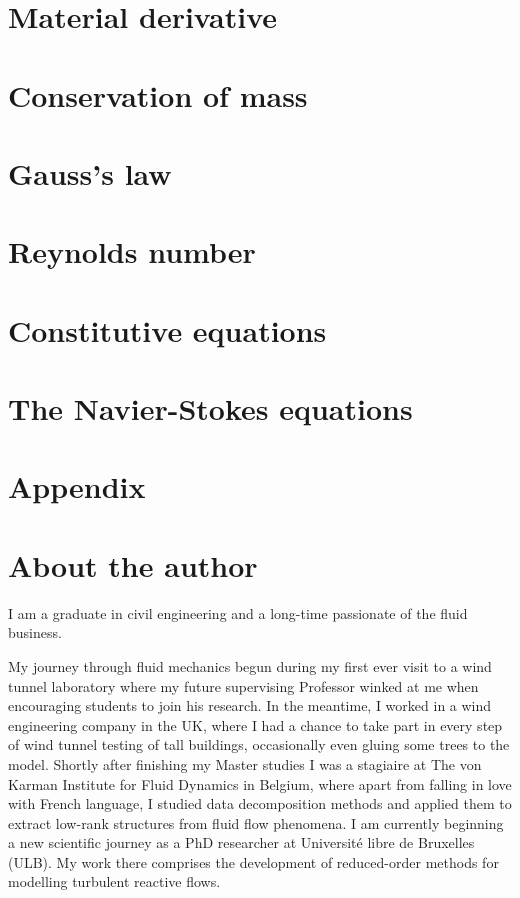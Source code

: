 \documentclass[10pt]{report}
\begin{document}


\chapter{Material derivative}

\chapter{Conservation of mass}



\chapter{Gauss's law}

\chapter{Reynolds number}



\chapter{Constitutive equations}

\chapter{The Navier-Stokes equations}



\chapter*{Appendix}

\newpage
\thispagestyle{empty}

\chapter*{About the author}

I am a graduate in civil engineering and a long-time passionate of the fluid business.

My journey through fluid mechanics begun during my first ever visit to a wind tunnel laboratory where my future supervising Professor winked at me when encouraging students to join his research. In the meantime, I worked in a wind engineering company in the UK, where I had a chance to take part in every step of wind tunnel testing of tall buildings, occasionally even gluing some trees to the model. Shortly after finishing my Master studies I was a stagiaire at The von Karman Institute for Fluid Dynamics in Belgium, where apart from falling in love with French language, I studied data decomposition methods and applied them to extract low-rank structures from fluid flow phenomena. I am currently beginning a new scientific journey as a PhD researcher at Université libre de Bruxelles (ULB). My work there comprises the development of reduced-order methods for modelling turbulent reactive flows.
\end{document}

